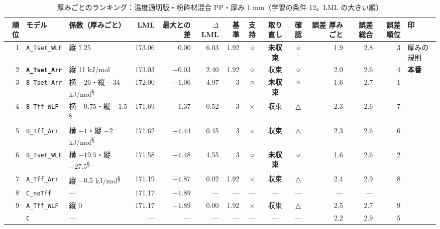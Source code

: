 \documentclass[paper=a4paper,landscape,fontsize=10pt,line_length=62zw,number_of_lines=34]{jlreq}
\let\origtextbf\textbf
\renewcommand{\textbf}[1]{\origtextbf{\gtfamily #1}}   %
\begin{document}
\begin{table}[H]\centering\footnotesize
\caption{厚みごとのランキング：温度適切版・粉砕材混合 PP・厚み 1 mm（学習の条件 12。LML の大きい順）}
\begin{tabular}{rlp{11\zw}rrrrccc rrrl}
\toprule
順位 & モデル & 係数（厚みごと） & LML & 最大との差 & $\Delta$LML & 基準 & 支持 & 取り直し & 確認 & 誤差 厚みごと & 誤差 総合 & 誤差順位 & 印 \\
\midrule
1 & \texttt{A\_\allowbreak{}Tset\_\allowbreak{}WLF} & 縦 7.25 & 173.06 & 0.00 & 6.03 & 1.92 & ○ & \textbf{未収束} & ○ & 1.9 & 2.8 & 3 & 厚みの規則 \\
2 & \textbf{\texttt{A\_\allowbreak{}Tset\_\allowbreak{}Arr}} & 縦 11 kJ/mol & 173.03 & $-0.03$ & 2.40 & 1.92 & ○ & 収束 & ○ & 2.0 & 2.6 & 4 & \textbf{本番} \\
3 & \texttt{B\_\allowbreak{}Tset\_\allowbreak{}Arr} & 横 $-26$・縦 $-34$ kJ/mol\textsuperscript{§} & 172.00 & $-1.06$ & 4.97 & 3 & ○ & \textbf{未収束} & ○ & 1.6 & 2.7 & 1 &  \\
4 & \texttt{B\_\allowbreak{}Tff\_\allowbreak{}WLF} & 横 $-0.75$・縦 $-1.5$\textsuperscript{§} & 171.69 & $-1.37$ & 0.52 & 3 & × & 収束 & △ & 2.3 & 2.6 & 7 &  \\
5 & \texttt{B\_\allowbreak{}Tff\_\allowbreak{}Arr} & 横 $-1$・縦 $-2$ kJ/mol\textsuperscript{§} & 171.62 & $-1.44$ & 0.45 & 3 & × & 収束 & △ & 2.3 & 2.6 & 6 &  \\
6 & \texttt{B\_\allowbreak{}Tset\_\allowbreak{}WLF} & 横 $-19.5$・縦 $-27.5$\textsuperscript{§} & 171.58 & $-1.48$ & 4.55 & 3 & ○ & \textbf{未収束} & ○ & 1.6 & 2.6 & 2 &  \\
7 & \texttt{A\_\allowbreak{}Tff\_\allowbreak{}Arr} & 縦 $-0.5$ kJ/mol\textsuperscript{§} & 171.19 & $-1.87$ & 0.02 & 1.92 & × & 収束 & △ & 2.4 & 2.9 & 8 &  \\
8 & \texttt{C\_\allowbreak{}noTff} & --- & 171.17 & $-1.89$ & --- & --- & --- & --- & --- & --- & --- &  &  \\
9 & \texttt{A\_\allowbreak{}Tff\_\allowbreak{}WLF} & 縦 0 & 171.17 & $-1.89$ & 0.00 & 1.92 & × & 収束 & △ & 2.5 & 2.7 & 9 &  \\
 & \texttt{C} & --- & --- & --- & --- & --- & --- & --- & --- & 2.2 & 2.9 & 5 &  \\
\bottomrule
\end{tabular}
\end{table}
\end{document}
